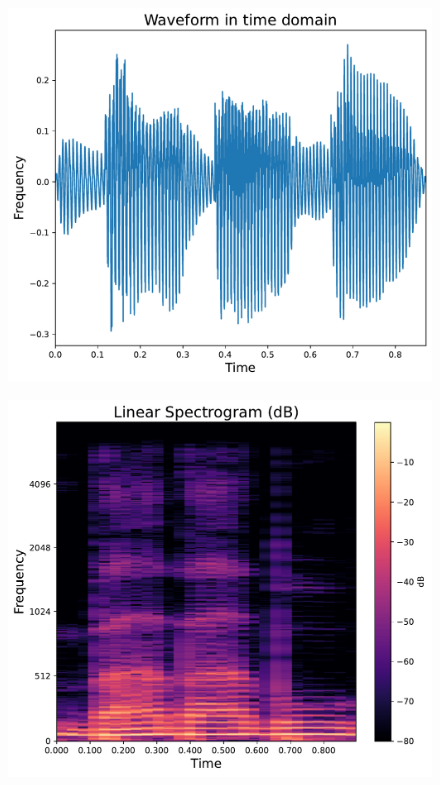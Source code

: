 \begin{figure}[h]
	\centering
	\begin{minipage}[b]{0.3\linewidth}
		\includegraphics[width=\linewidth]{"graphs/sectr_example/Waveform in time domain"}
		\label{fig:waveform-in-time-domain}
	\end{minipage}
	\hfill
	\begin{minipage}[b]{0.3\linewidth}
		\includegraphics[width=\linewidth]{"graphs/sectr_example/Linear Spectrogram (dB)"}

\end{minipage}
\end{figure}
